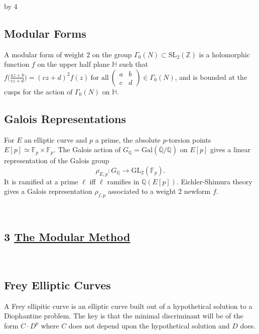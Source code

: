 \documentclass[12pt]{scrartcl}
\def\F{{\mathbb F}}
\def\H{{\mathbb H}}
\def\Q{{\mathbb Q}}
\def\Z{{\mathbb Z}}
\newcommand{\GL}{\text{GL}}
\newcommand{\SL}{\text{SL}}
\renewcommand{\bar}{\overline}
\newcommand{\Gal}{\text{Gal}}
\def\anzspalten{4}
\newlength{\kastenwidth}
\newenvironment{kasten}{%
  \begin{lrbox}{\dummybox}%
    \begin{minipage}{0.96\linewidth}}%
    {\end{minipage}%
  \end{lrbox}%
  \raisebox{-\depth}{\psshadowbox[framesep=1em]{\usebox{\dummybox}}}\\[0.5em]}
\newenvironment{spalte}{%
  \setlength\kastenwidth{1.2\textwidth}
  \divide\kastenwidth by \anzspalten
  \begin{minipage}[t]{\kastenwidth}}{\end{minipage}\hfill}
\begin{document}
\begin{lrbox}{\spalten}
{\begin{spalte}
\begin{kasten}
\subsection*{\color{blue} Modular Forms}
A modular form of weight $2$ on the group $\Gamma_0(N) \subset \SL_2(\Z)$ is a holomorphic function $f$ on the upper half plane $\H$ such that $f \big( \frac{az+b}{cz+d} \big) = (cz+d)^2 f(z) \ \text{for all} \ \begin{pmatrix} a & b \\ c & d \end{pmatrix} \in \Gamma_0(N)$, and is bounded at the cusps for the action of $\Gamma_0(N)$ on $\H$. 


\subsection*{\color{blue} Galois Representations}

For $E$ an elliptic curve and $p$ a prime, the absolute $p$-torsion points $E[p] \simeq \F_p \times \F_p$.
The Galois action of $G_\Q = \Gal(\bar{\Q}/\Q)$ on $E[p]$ gives a linear representation of the Galois group 
\[ \rho_{E,p} \colon G_\Q \rightarrow \GL_2(\F_p). \]
It is ramified at a prime $\ell$ iff $\ell$ ramifies in $\Q(E[p])$.  Eichler-Shimura theory gives a Galois representation $\rho_{f,p}$ associated to a weight $2$ newform $f$.

\end{kasten}

\begin{kasten}
\section*{3 \hspace{0.1cm} {\color{red} 
\underline{The Modular Method}}}
\end{kasten}

\begin{kasten}

\subsection*{\color{blue} Frey Elliptic Curves}

A Frey ellipitic curve is an elliptic curve built out of a hypothetical solution to a Diophantine problem.  The key is that the minimal discriminant will be of the form $C\cdot D^p$ where $C$ does not depend upon the hypothetical solution and $D$ does. \\


\end{kasten}
\end{spalte}}
\end{lrbox}
\end{document}
